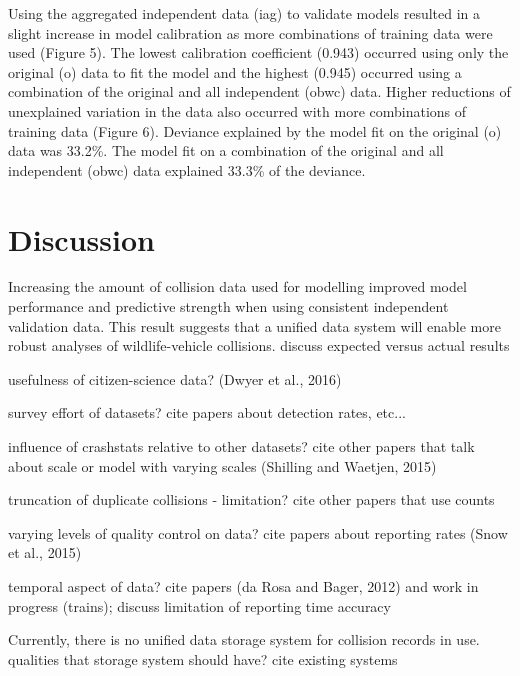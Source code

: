 Using the aggregated independent data (iag) to validate models resulted in a slight increase in model calibration as more combinations of training data were used (Figure 5).  The lowest calibration coefficient (0.943) occurred using only the original (o) data to fit the model and the highest (0.945) occurred using a combination of the original and all independent (obwc) data. Higher reductions of unexplained variation in the data also occurred with more combinations of training data (Figure 6). Deviance explained by the model fit on the original (o) data was 33.2\%. The model fit on a combination of the original and all independent (obwc) data explained 33.3\% of the deviance.

\section{Discussion}

Increasing the amount of collision data used for modelling improved model performance and predictive strength when using consistent independent validation data. This result suggests that a unified data system will enable more robust analyses of wildlife-vehicle collisions. discuss expected versus actual results

usefulness of citizen-science data? (Dwyer et al., 2016)

survey effort of datasets? cite papers about detection rates, etc...

influence of crashstats relative to other datasets? cite other papers that talk about scale or model with varying scales (Shilling and Waetjen, 2015)

truncation of duplicate collisions - limitation? cite other papers that use counts

varying levels of quality control on data? cite papers about reporting rates (Snow et al., 2015)

temporal aspect of data? cite papers (da Rosa and Bager, 2012) and work in progress (trains); discuss limitation of reporting time accuracy

Currently, there is no unified data storage system for collision records in use. qualities that storage system should have? cite existing systems